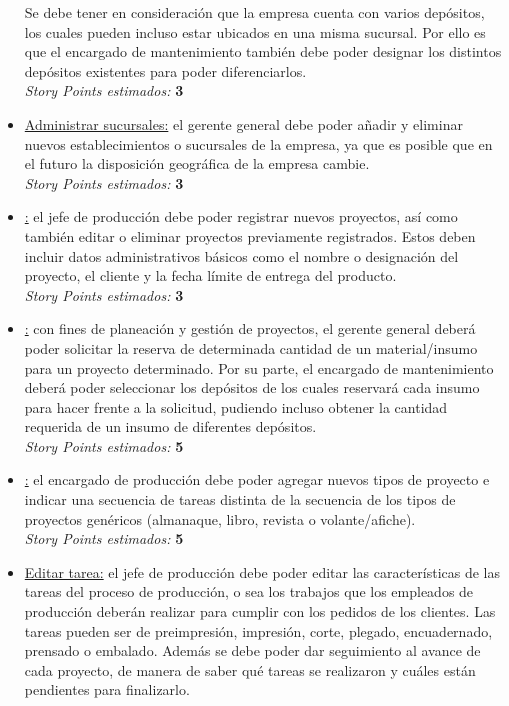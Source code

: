 \documentclass[a4paper, 12pt,twoside]{report}  %
\numberwithin{equation}{subsection} %
\begin{document}
\begin{itemize}
	Se debe tener en consideración que la empresa cuenta con varios depósitos, los cuales pueden incluso estar ubicados en una misma sucursal. Por ello es que el encargado de mantenimiento también debe poder designar los distintos depósitos existentes para poder diferenciarlos.\\
	\textit{Story Points estimados:} \textbf{3}
	\item \underline{Administrar sucursales:} el gerente general debe poder añadir y eliminar nuevos establecimientos o sucursales de la empresa, ya que es posible que en el futuro la disposición geográfica de la empresa cambie.\\
	\textit{Story Points estimados:} \textbf{3}
	\item \underline{:} el jefe de producción debe poder registrar nuevos proyectos, así como también editar o eliminar proyectos previamente registrados. Estos deben incluir datos administrativos básicos como el nombre o designación del proyecto, el cliente y la fecha límite de entrega del producto.\\
	\textit{Story Points estimados:} \textbf{3}
	\item \underline{:} con fines de planeación y gestión de proyectos, el gerente general deberá poder solicitar la reserva de determinada cantidad de un material/insumo para un proyecto determinado. Por su parte, el encargado de mantenimiento deberá poder seleccionar los depósitos de los cuales reservará cada insumo para hacer frente a la solicitud, pudiendo incluso obtener la cantidad requerida de un insumo de diferentes depósitos.\\
	\textit{Story Points estimados:} \textbf{5}
	\item \underline{:} el encargado de producción debe poder agregar nuevos tipos de proyecto e indicar una secuencia de tareas distinta de la secuencia de los tipos de proyectos genéricos (almanaque, libro, revista o volante/afiche).\\
	\textit{Story Points estimados:} \textbf{5}
	\item \underline{Editar tarea:} el jefe de producción debe poder editar las características de las tareas del proceso de producción, o sea los trabajos que los empleados de producción deberán realizar para cumplir con los pedidos de los clientes. Las tareas pueden ser de preimpresión, impresión, corte, plegado, encuadernado, prensado o embalado. Además se debe poder dar seguimiento al avance de cada proyecto, de manera de saber qué tareas se realizaron y cuáles están pendientes para finalizarlo.\\

\end{itemize}
\end{document}
